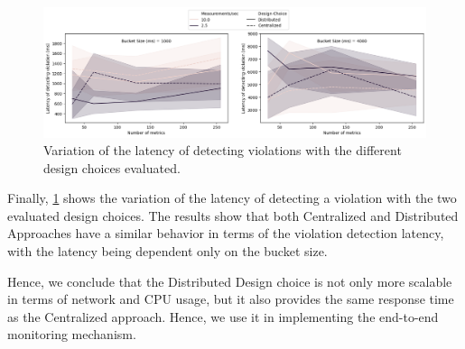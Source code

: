 \begin{figure}
\centering
\includegraphics[width=\linewidth]{figures/design_space/monitoring/response_time.png}
\caption{Variation of the latency of detecting violations with the different design choices evaluated.}
\label{fig:monitoring_response_time}
\end{figure}
Finally, \cref{fig:monitoring_response_time} shows the variation of the latency of detecting a violation with the two evaluated design choices. The results show that both Centralized and Distributed Approaches have a similar behavior in terms of the violation detection latency, with the latency being dependent only on the bucket size. 
\par Hence, we conclude that the Distributed Design choice is not only more scalable in terms of network and CPU usage, but it also provides the same response time as the Centralized approach. Hence, we use it in implementing the end-to-end monitoring mechanism.



